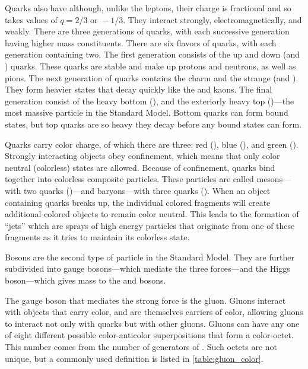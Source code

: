 Quarks also have \spinhalf although, unlike the leptons, their charge is
fractional and so takes values of $q = 2/3 \text{ or } -1/3$. They interact
strongly, electromagnetically, and weakly. There are three generations of
quarks, with each successive generation having higher mass constituents. There
are six flavors of quarks, with each generation containing two. The first
generation consists of the up and down (\upquark and \downquark) quarks. These
quarks are stable and make up protons and neutrons, as well as pions. The next
generation of quarks contains the charm and the strange (\charmquark and
\strangequark). They form heavier states that decay quickly like the \jpsi and
kaons. The final generation consist of the heavy bottom (\bottomquark), and the
exteriorly heavy top (\topquark)---the most massive particle in the Standard
Model. Bottom quarks can form bound states, but top quarks are so heavy they
decay before any bound states can form.

Quarks carry color charge, of which there are three: red (\red), blue (\blue),
and green (\green). Strongly interacting objects obey confinement, which means
that only color neutral (colorless) states are allowed. Because of confinement,
quarks bind together into colorless composite particles. These particles are
called mesons---with two quarks (\qqbar)---and baryons---with three quarks
(\baryon). When an object containing quarks breaks up, the individual colored
fragments will create additional colored objects to remain color neutral. This
leads to the formation of ``jets'' which are sprays of high energy particles
that originate from one of these fragments as it tries to maintain its
colorless state.

Bosons are the second type of particle in the Standard Model. They are further
subdivided into gauge bosons---which mediate the three forces---and the Higgs
boson---which gives mass to the \W and \Z bosons.

The gauge boson that mediates the strong force is the gluon. Gluons interact
with objects that carry color, and are themselves carriers of color, allowing
gluons to interact not only with quarks but with other gluons. Gluons can have
any one of eight different possible color-anticolor superpositions that form a
color-octet. This number comes from the number of generators of \SUthree. Such
octets are not unique, but a commonly used definition is listed in
\cref{table:gluon_color}.



